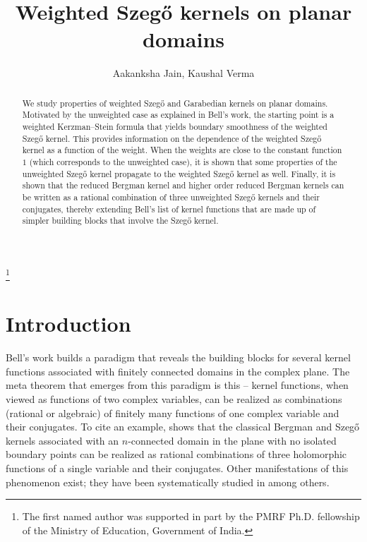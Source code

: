 \documentclass[11pt, reqno]{amsart}
\numberwithin{equation}{section}
\begin{document}
\title[Weighted Szeg\H{o} kernels]{Weighted Szeg\H{o} kernels on planar domains}
    \thanks{The first named author was supported in part by the PMRF Ph.D. fellowship of the Ministry of Education, Government of India.}
	\author{Aakanksha Jain, Kaushal Verma} 
\address{AJ: Department of Mathematics, Indian Institute of Science, Bengaluru-560012, India}

\address{KV: Department of Mathematics, Indian Institute of Science, Bengaluru-560012, India}

\begin{abstract}
We study properties of weighted Szeg\H{o} and Garabedian kernels on planar domains. Motivated by the unweighted case as explained in Bell's work, the starting point is a weighted Kerzman--Stein formula that yields boundary smoothness of the weighted Szeg\H{o} kernel. This provides information on the dependence of the weighted Szeg\H{o} kernel as a function of the weight. When the weights are close to the constant function $1$ (which corresponds to the unweighted case), it is shown that some properties of the unweighted Szeg\H{o} kernel propagate to the weighted Szeg\H{o} kernel as well. Finally, it is shown that the reduced Bergman kernel and higher order reduced Bergman kernels can be written as a rational combination of three unweighted Szeg\H{o} kernels and their conjugates, thereby extending Bell's list of kernel functions that are made up of simpler building blocks that involve the Szeg\H{o} kernel.
\end{abstract}

\maketitle

\section{Introduction}

\noindent Bell's work builds a paradigm that reveals the building blocks for several kernel functions associated with finitely connected domains in the complex plane. The meta theorem that emerges from this paradigm is this -- kernel functions, when viewed as functions of two complex variables, can be realized as combinations (rational or algebraic) of finitely many functions of one complex variable and their conjugates. To cite an example, \cite{Be1} shows that the classical Bergman and Szeg\H{o} kernels associated with an $n$-connected domain in the plane with no isolated boundary points can be realized as rational combinations of three holomorphic functions of a single variable and their conjugates. Other manifestations of this phenomenon exist; they have been systematically studied in \cite{Be2, Be3} among others. 
\end{document}
